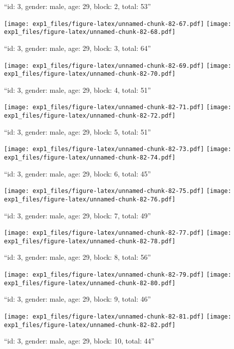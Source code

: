 \documentclass[11pt,,]{article}
\begin{document}
``id: 3, gender: male, age: 29, block: 2, total: 53''

\texttt{[image: exp1\_files/figure-latex/unnamed-chunk-82-67.pdf]}
\texttt{[image: exp1\_files/figure-latex/unnamed-chunk-82-68.pdf]}

\newpage
[1] 

``id: 3, gender: male, age: 29, block: 3, total: 64''

\texttt{[image: exp1\_files/figure-latex/unnamed-chunk-82-69.pdf]}
\texttt{[image: exp1\_files/figure-latex/unnamed-chunk-82-70.pdf]}

\newpage
[1] 

``id: 3, gender: male, age: 29, block: 4, total: 51''

\texttt{[image: exp1\_files/figure-latex/unnamed-chunk-82-71.pdf]}
\texttt{[image: exp1\_files/figure-latex/unnamed-chunk-82-72.pdf]}

\newpage
[1] 

``id: 3, gender: male, age: 29, block: 5, total: 51''

\texttt{[image: exp1\_files/figure-latex/unnamed-chunk-82-73.pdf]}
\texttt{[image: exp1\_files/figure-latex/unnamed-chunk-82-74.pdf]}

\newpage
[1] 

``id: 3, gender: male, age: 29, block: 6, total: 45''

\texttt{[image: exp1\_files/figure-latex/unnamed-chunk-82-75.pdf]}
\texttt{[image: exp1\_files/figure-latex/unnamed-chunk-82-76.pdf]}

\newpage
[1] 

``id: 3, gender: male, age: 29, block: 7, total: 49''

\texttt{[image: exp1\_files/figure-latex/unnamed-chunk-82-77.pdf]}
\texttt{[image: exp1\_files/figure-latex/unnamed-chunk-82-78.pdf]}

\newpage
[1] 

``id: 3, gender: male, age: 29, block: 8, total: 56''

\texttt{[image: exp1\_files/figure-latex/unnamed-chunk-82-79.pdf]}
\texttt{[image: exp1\_files/figure-latex/unnamed-chunk-82-80.pdf]}

\newpage
[1] 

``id: 3, gender: male, age: 29, block: 9, total: 46''

\texttt{[image: exp1\_files/figure-latex/unnamed-chunk-82-81.pdf]}
\texttt{[image: exp1\_files/figure-latex/unnamed-chunk-82-82.pdf]}

\newpage
[1] 

``id: 3, gender: male, age: 29, block: 10, total: 44''
\end{document}
